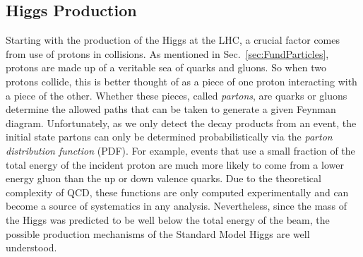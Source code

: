 \subsection{Higgs Production}
\label{sec:HiggsProduction}

Starting with the production of the Higgs at the LHC, a crucial factor comes from use of protons in collisions. As mentioned in Sec.~\ref{sec:FundParticles}, protons are made up of a veritable sea of quarks and gluons. So when two protons collide, this is better thought of as a piece of one proton interacting with a piece of the other. Whether these pieces, called \textit{partons}, are quarks or gluons determine the allowed paths that can be taken to generate a given Feynman diagram. Unfortunately, as we only detect the decay products from an event, the initial state partons can only be determined probabilistically via the \textit{parton distribution function} (PDF). For example, events that use a small fraction of the total energy of the incident proton are much more likely to come from a lower energy gluon than the up or down valence quarks. Due to the theoretical complexity of QCD, these functions are only computed experimentally and can become a source of systematics in any analysis. Nevertheless, since the mass of the Higgs was predicted to be well below the total energy of the beam, the possible production mechanisms of the Standard Model Higgs are well understood.


